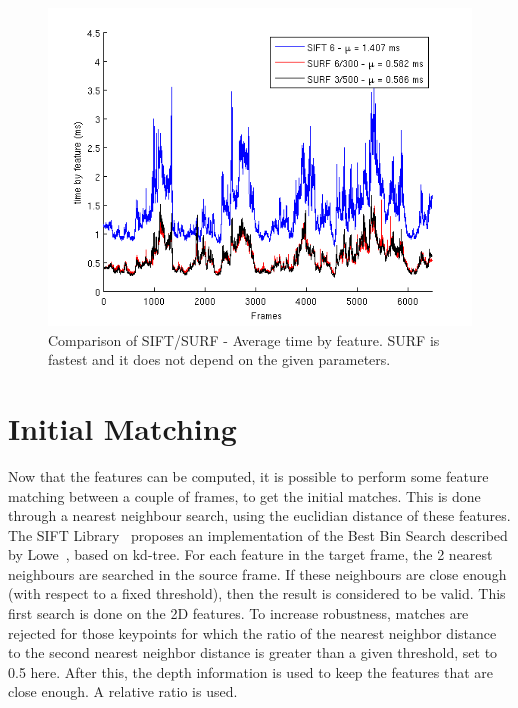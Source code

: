 \begin{figure}[h!]
\begin{center}
\includegraphics[width=1.0\textwidth]{figures/stats_features_tbf}
\caption{Comparison of SIFT/SURF - Average time by feature. SURF is fastest and it does not depend on the given parameters.}
\end{center}
\end{figure}

\section{Initial Matching}

Now that the features can be computed, it is possible to perform some feature matching between a couple of frames, to get the initial matches. This is done through a nearest neighbour search, using the euclidian distance of these features.  
The \gls{SIFT} Library~\cite{hess_sift} proposes an implementation of the Best Bin Search described by Lowe~\cite{lowe_2004_sift}, based on kd-tree. For each feature in the target frame, the 2 nearest neighbours are searched in the source frame. If these neighbours are close enough (with respect to a fixed threshold), then the result is considered to be valid. This first search is done on the 2D features. To increase robustness, matches are rejected for those keypoints for which the ratio of the nearest neighbor distance to the second nearest neighbor distance is greater than a given threshold, set to 0.5 here. 
After this, the depth information is used to keep the features that are close enough. A relative ratio is used.

